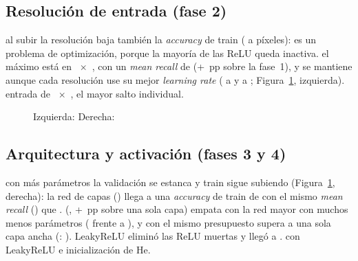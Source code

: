 \subsection{Resolución de entrada (fase 2)}
{al subir la resolución baja también la \emph{accuracy} de train ( a  píxeles):
es un problema de optimización, porque la mayoría de las ReLU queda inactiva.}
{el máximo está en ~$\times$~, con un \emph{mean recall} de 
(+~pp sobre la fase~1), y se mantiene aunque cada resolución use su mejor \emph{learning rate}
( a  y  a ;
Figura~\ref{fig:arch}, izquierda).}
{entrada de ~$\times$~, el mayor salto individual.}

\begin{figure}[t]
  \centering
  \begin{minipage}[t]{0.49\linewidth}\centering
  \end{minipage}\hfill
  \begin{minipage}[t]{0.49\linewidth}\centering
  \end{minipage}
  \caption{Izquierda:  Derecha: }
  \label{fig:arch}
\end{figure}

\subsection{Arquitectura y activación (fases 3 y 4)}
{con más parámetros la validación se estanca y train sigue subiendo (Figura~\ref{fig:arch}, derecha): la red de
 capas () llega a una \emph{accuracy} de train de
 con el mismo \emph{mean recall} () que .}
{ (, +~pp sobre una sola capa) empata con la red mayor con
muchos menos parámetros ( frente a ), y con el mismo presupuesto supera a una
sola capa ancha (: ). LeakyReLU eliminó las ReLU muertas y llegó a
.}
{ con LeakyReLU e inicialización de He.}

